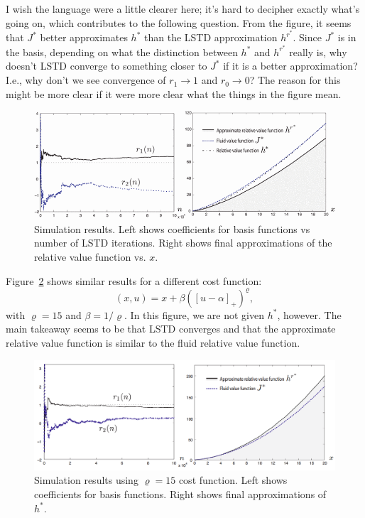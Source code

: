 \documentclass[11pt]{article}
\begin{document}
I wish the language were a little clearer here; it's hard to decipher exactly what's going on, which contributes to the following question. From the figure, it seems that $J^*$ better approximates $h^*$ than the LSTD approximation $h^{r^*}$. Since $J^*$ is in the basis, depending on what the distinction between $h^*$ and $h^{r^*}$ really is, why doesn't LSTD converge to something closer to $J^*$ if it is a better approximation? I.e., why don't we see convergence of $r_1 \rightarrow 1$ and $r_0 \rightarrow 0$? The reason for this might be more clear if it were more clear what the things in the figure mean.

\begin{center}
\begin{figure}
\includegraphics[width=14cm]{lstd_quad}
\caption{Simulation results. Left shows coefficients for basis functions vs number of LSTD iterations. Right shows final approximations of the relative value function vs. $x$.}\label{fig:lstd_2}
\end{figure}
\end{center}


Figure~\ref{fig:lstd_15} shows similar results for a different cost function:
$$(x,u) = x + \beta([u-\alpha]_+)^\varrho,$$
with $\varrho = 15$ and $\beta = 1/\varrho$. In this figure, we are not given $h^*$, however. The main takeaway seems to be that LSTD converges and that the approximate relative value function is similar to the fluid relative value function.

\begin{center}
\begin{figure}
\includegraphics[width=14cm]{lstd_15}
\caption{Simulation results using $\varrho=15$ cost function. Left shows coefficients for basis functions. Right shows final approximations of $h^*$.}\label{fig:lstd_15}
\end{figure}
\end{center}
\end{document}
